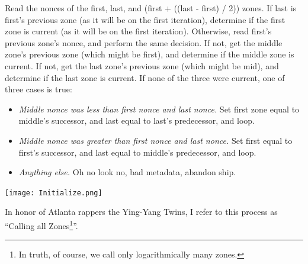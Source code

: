 \documentclass[letterpaper,10pt]{article}
\newenvironment{denseitemize}{
  \begin{itemize}
      \setlength{\itemsep}{0pt}
}{
  \end{itemize}
}
\begin{document}
Read the nonces of the first, last, and (first + ((last - first) / 2)) zones.
If last is first's previous zone (as it will be on the first iteration),
determine if the first zone is current (as it will be on the first iteration).
Otherwise, read first's previous zone's nonce, and perform the same
decision. If not, get the middle zone's previous zone (which might be first),
and determine if the middle zone is current. If not, get the last zone's previous
zone (which might be mid), and determine if the last zone is current. If none
of the three were current, one of three cases is true:
\begin{denseitemize}
\item \textit{Middle nonce was less than first nonce and last nonce.} Set first zone
  equal to middle's successor, and last equal to last's predecessor, and loop.
\item \textit{Middle nonce was greater than first nonce and last nonce.} Set
  first equal to first's successor, and last equal to middle's predecessor, and
  loop.
\item \textit{Anything else.} Oh no look no, bad metadata, abandon ship.
\end{denseitemize}

\begin{minipage}{\textwidth}
\begin{center}
\texttt{[image: Initialize.png]}
\end{center}
\end{minipage}

In honor of Atlanta rappers the Ying-Yang Twins, I refer to this process as
``Calling all Zones\footnote{In truth, of course, we call only logarithmically
  many zones.}''.
\end{document}
